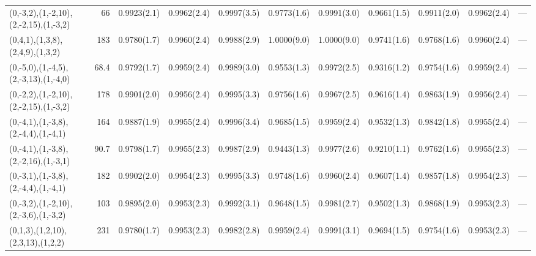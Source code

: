 \begin{tabular}{lrlllllllll}
 (0,-3,2),(1,-2,10),(2,-2,15),(1,-3,2) &   66   & 0.9923(2.1) & 0.9962(2.4) & 0.9997(3.5) & 0.9773(1.6)    & 0.9991(3.0)  & 0.9661(1.5)    & 0.9911(2.0)  & 0.9962(2.4) & ---    \\
 (0,4,1),(1,3,8),(2,4,9),(1,3,2)       &  183   & 0.9780(1.7) & 0.9960(2.4) & 0.9988(2.9) & 1.0000(9.0)    & 1.0000(9.0)  & 0.9741(1.6)    & 0.9768(1.6)  & 0.9960(2.4) & ---    \\
 (0,-5,0),(1,-4,5),(2,-3,13),(1,-4,0)  &   68.4 & 0.9792(1.7) & 0.9959(2.4) & 0.9989(3.0) & 0.9553(1.3)    & 0.9972(2.5)  & 0.9316(1.2)    & 0.9754(1.6)  & 0.9959(2.4) & ---    \\
 (0,-2,2),(1,-2,10),(2,-2,15),(1,-3,2) &  178   & 0.9901(2.0) & 0.9956(2.4) & 0.9995(3.3) & 0.9756(1.6)    & 0.9967(2.5)  & 0.9616(1.4)    & 0.9863(1.9)  & 0.9956(2.4) & ---    \\
 (0,-4,1),(1,-3,8),(2,-4,4),(1,-4,1)   &  164   & 0.9887(1.9) & 0.9955(2.4) & 0.9996(3.4) & 0.9685(1.5)    & 0.9959(2.4)  & 0.9532(1.3)    & 0.9842(1.8)  & 0.9955(2.4) & ---    \\
 (0,-4,1),(1,-3,8),(2,-2,16),(1,-3,1)  &   90.7 & 0.9798(1.7) & 0.9955(2.3) & 0.9987(2.9) & 0.9443(1.3)    & 0.9977(2.6)  & 0.9210(1.1)    & 0.9762(1.6)  & 0.9955(2.3) & ---    \\
 (0,-3,1),(1,-3,8),(2,-4,4),(1,-4,1)   &  182   & 0.9902(2.0) & 0.9954(2.3) & 0.9995(3.3) & 0.9748(1.6)    & 0.9960(2.4)  & 0.9607(1.4)    & 0.9857(1.8)  & 0.9954(2.3) & ---    \\
 (0,-3,2),(1,-2,10),(2,-3,6),(1,-3,2)  &  103   & 0.9895(2.0) & 0.9953(2.3) & 0.9992(3.1) & 0.9648(1.5)    & 0.9981(2.7)  & 0.9502(1.3)    & 0.9868(1.9)  & 0.9953(2.3) & ---    \\
 (0,1,3),(1,2,10),(2,3,13),(1,2,2)     &  231   & 0.9780(1.7) & 0.9953(2.3) & 0.9982(2.8) & 0.9959(2.4)    & 0.9991(3.1)  & 0.9694(1.5)    & 0.9754(1.6)  & 0.9953(2.3) & ---    \\
\hline
\end{tabular}